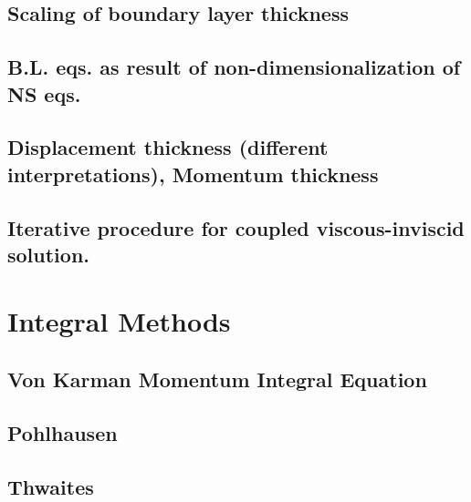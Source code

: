\documentclass[oneside,a4paper,11pt]{report}
\begin{document}
\subsection{Scaling of boundary layer thickness}

\subsection{B.L. eqs. as result of non-dimensionalization of NS eqs.}

\subsection{Displacement thickness (different interpretations), Momentum thickness}

\subsection{Iterative procedure for coupled viscous-inviscid solution.}

\section{Integral Methods}

\subsection{Von Karman Momentum Integral Equation}

\subsection{Pohlhausen}

\subsection{Thwaites}
\end{document}
